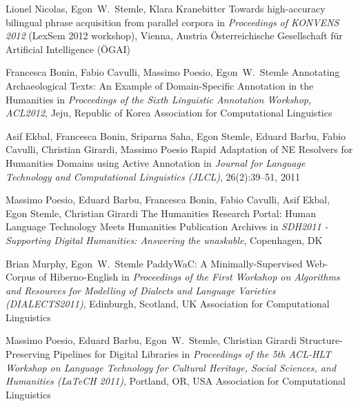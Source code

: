 \documentclass[11pt,a4paper]{moderncv}
\begin{document}
        {Lionel Nicolas, Egon~W.~Stemle, Klara Kranebitter}
        {\small Towards high-accuracy bilingual phrase acquisition from parallel corpora}
        {\small in {\em Proceedings of KONVENS 2012} (LexSem 2012 workshop), Vienna, Austria}
        {\small \"{O}sterreichische Gesellschaft f\"{u}r Artificial Intelligence (\"{O}GAI)}
        {}
    
        {Francesca Bonin, Fabio Cavulli, Massimo Poesio, Egon~W.~Stemle}
        {\small Annotating Archaeological Texts: An Example of
        Domain-Specific Annotation in the Humanities}
        {\small in {\em Proceedings of the Sixth Linguistic Annotation
        Workshop, ACL2012}, Jeju, Republic of Korea}
        {\small Association for Computational Linguistics}
        {}

        {Asif Ekbal, Francesca Bonin, Sriparna Saha, Egon Stemle, Eduard Barbu,
        Fabio Cavulli, Christian Girardi, Massimo Poesio}
        {\small Rapid Adaptation of NE Resolvers for Humanities Domains using
        Active Annotation}
        {\small in {\em Journal for Language Technology and Computational Linguistics (JLCL)},
        26(2):39--51, 2011}
        {}
        {}

        {Massimo Poesio, Eduard Barbu, Francesca Bonin, Fabio Cavulli, Asif
        Ekbal, Egon Stemle, Christian Girardi}
        {\small The Humanities Research Portal: Human Language Technology Meets
        Humanities Publication Archives}
        {\small in {\em SDH2011 - Supporting Digital Humanities: Answering the
        unaskable}, Copenhagen, DK}
        {}
        {}

        {Brian Murphy, Egon~W.~Stemle}
        {\small PaddyWaC: A Minimally-Supervised Web-Corpus of Hiberno-English}
        {\small in {\em Proceedings of the First Workshop on Algorithms and
        Resources for Modelling of Dialects and Language Varieties
        (DIALECTS2011)}, Edinburgh, Scotland, UK}
        {\small Association for Computational Linguistics}
        {}

        {Massimo Poesio, Eduard Barbu, Egon~W.~Stemle, Christian Girardi}
        {Structure-Preserving Pipelines for Digital Libraries}
        {\small in {\em Proceedings of the 5th ACL-HLT Workshop on Language
        Technology for Cultural Heritage, Social Sciences, and Humanities
        (LaTeCH 2011)}, Portland, OR, USA}
        {\small Association for Computational Linguistics}
        {}
\end{document}
